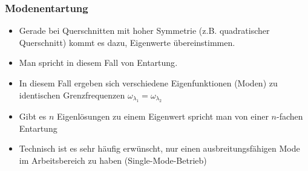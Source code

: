 \begin{frame}
  \frametitle{Modenentartung}
  \begin{itemize}[<+->]
  \item Gerade bei Querschnitten mit \alert{hoher Symmetrie} (z.B. quadratischer Querschnitt) kommt es dazu, \alert{Eigenwerte übereinstimmen}.
  \item Man spricht in diesem Fall von \alert{Entartung}.
  \item In diesem Fall ergeben sich verschiedene \alert{Eigenfunktionen} (Moden) zu identischen Grenzfrequenzen \(\omega_{\lambda_1} = \omega_{\lambda_2}\)
  \item Gibt es \(n\) Eigenlösungen zu einem Eigenwert spricht man von einer \alert{\(n\)-fachen Entartung}
    \item Technisch ist es sehr häufig erwünscht, nur einen ausbreitungsfähigen Mode im Arbeitsbereich zu haben (\alert{Single-Mode-Betrieb}) 
  \end{itemize}
\end{frame}
    

   

